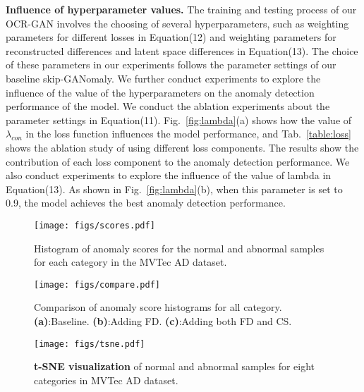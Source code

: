 \documentclass[lettersize,journal]{IEEEtran}
\begin{document}
\noindent\textbf{Influence of hyperparameter values.} 
The training and testing process of our OCR-GAN involves the choosing of several hyperparameters, such as weighting parameters for different losses in Equation(12) and weighting parameters for reconstructed differences and latent space differences in Equation(13). The choice of these parameters in our experiments follows the parameter settings of our baseline skip-GANomaly. We further conduct experiments to explore the influence of the value of the hyperparameters on the anomaly detection performance of the model.
We conduct the ablation experiments about the parameter settings in Equation(11). Fig.~\ref{fig:lambda}(a) shows how the value of $\lambda_{con}$ in the loss function influences the model performance, and Tab.~\ref{table:loss} shows the ablation study of using different loss components. The results show the contribution of each loss component to the anomaly detection performance.
We also conduct experiments to explore the influence of the value of lambda in Equation(13). As shown in Fig.~\ref{fig:lambda}(b), when this parameter is set to 0.9, the model achieves the best anomaly detection performance. 


\begin{figure*}[t]
    \centering
    \texttt{[image: figs/scores.pdf]} 
    \caption{Histogram of anomaly scores for the normal and abnormal samples for each category in the MVTec AD dataset.}
    \label{fig:scores}
\end{figure*}
\begin{figure*}[t]
	\centering
	\texttt{[image: figs/compare.pdf]}
	\caption{Comparison of anomaly score histograms for all category. \textbf{(a)}:Baseline. \textbf{(b)}:Adding FD. \textbf{(c)}:Adding both FD and CS.}
	\label{fig:com_score}
\end{figure*}

\begin{figure*}[tp]
	\centering
	\texttt{[image: figs/tsne.pdf]}
	\caption{\textbf{t-SNE visualization} of normal and abnormal samples for eight categories in MVTec AD dataset.}
	\label{fig:tsne}
\end{figure*}
\end{document}
